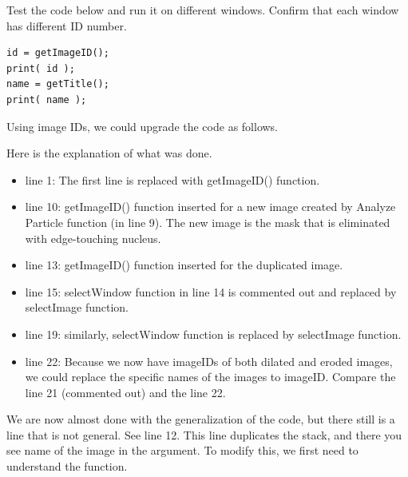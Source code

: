 \begin{indentexercise}{1}
Test the code below and run it on different windows. Confirm that each window has different ID number. 
\begin{lstlisting}
id = getImageID();
print( id );
name = getTitle();
print( name );
\end{lstlisting}
\end{indentexercise}

Using image IDs, we could upgrade the code as follows. 



Here is the explanation of what was done. 
\begin{itemize}
  \item line 1: The first line is replaced with getImageID() function. 
  \item line 10: getImageID() function inserted for a new image created by Analyze Particle function (in line 9). The new image is the mask that is eliminated with edge-touching nucleus. 
  \item line 13: getImageID() function inserted for the duplicated image. 
  \item line 15: selectWindow function in line 14 is commented out and replaced by selectImage function. 
  \item line 19: similarly, selectWindow function is replaced by selectImage function. 
  \item line 22: Because we now have imageIDs of both dilated and eroded images, we could replace the specific names of the images to imageID. Compare the line 21 (commented out) and the line 22. 
\end{itemize}

We are now almost done with the generalization of the code, but there still is a line that is not general. See line 12. This line duplicates the stack, and there you see name of the image in the argument. To modify this, we first need to understand the  function. 

\begin{indentCom}
\end{indentCom}


